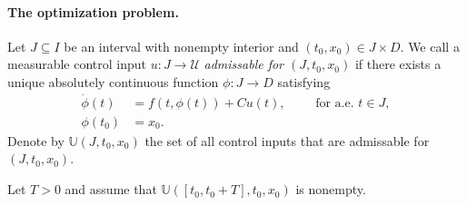 \documentclass[../Master.tex]{subfiles}
\begin{document}
\paragraph{The optimization problem.}

Let \(J \subseteq I\) be an interval with nonempty interior and \((t_0, x_0) \in J \times D\). We call a measurable control input \(u: J \to \mathcal{U}\) \emph{admissable for \((J, t_0, x_0)\)} if there exists a unique absolutely continuous function \(\phi: J \to D\) satisfying
\begin{equation*}
  \begin{aligned}
    \dot{\phi}(t) &= f(t, \phi(t)) + C u(t), \qquad \text{ for a.e. } t \in J, \\
    \phi(t_0) &= x_0.
  \end{aligned}
\end{equation*}
Denote by \(\mathbb{U}(J, t_0, x_0)\) the set of all control inputs that are admissable for \((J, t_0, x_0)\).

Let \(T > 0\) and assume that \(\mathbb{U}([t_0, t_0 + T], t_0, x_0)\) is nonempty. 
\end{document}
